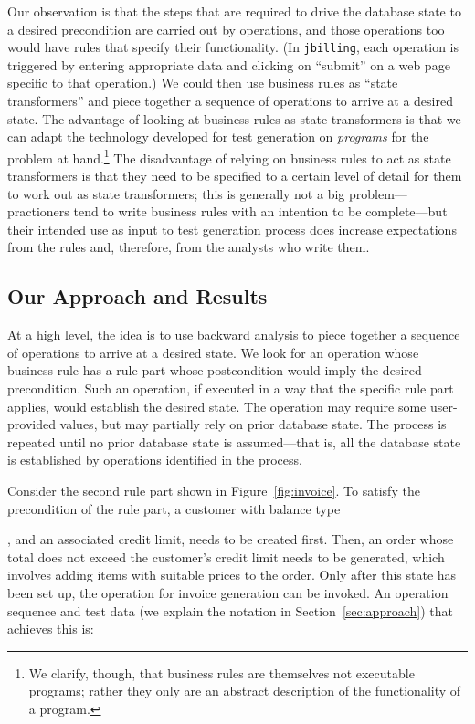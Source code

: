 Our observation is that the steps that are required to drive the database state
to a desired precondition are carried out by operations, and those operations
too would have rules that specify their functionality.  (In \texttt{jbilling}, each
operation is triggered by entering appropriate data and clicking on ``submit'' on
a web page specific to that operation.) We could then use
business rules as ``state transformers'' and piece together a sequence of
operations to arrive at a desired state.  The advantage of looking at business
rules as state transformers is that we can adapt the technology developed for
test generation on \textit{programs} for the problem at hand.\footnote{We
  clarify, though, that business rules are themselves not executable programs;
  rather they only are an abstract description of the functionality of a
  program.}  The disadvantage of relying on business rules to act as state
transformers is that they need to be specified to a certain level of detail for
them to work out as state transformers; this is generally not a big
problem---practioners tend to write business rules with an intention to be
complete---but their intended use as input to test generation process does
increase expectations from the rules and, therefore, from the analysts who write
them.

\subsection{Our Approach and Results}

At a high level, the idea is to use backward analysis to piece together a
sequence of operations to arrive at a desired state.  We look for an operation
whose business rule has a rule part whose postcondition would imply the desired
precondition.  Such an operation, if executed in a way that the specific rule
part applies, would establish the desired state.  The operation may require some
user-provided values, but may partially rely on prior database state. The
process is repeated until no prior database state is assumed---that is, all the
database state is established by operations identified in the process.

Consider the second rule part shown in Figure~\ref{fig:invoice}. To satisfy the
precondition of the rule part, a customer with balance type \subject{Credit},
and an associated credit limit, needs to be created first. Then, an order whose
total does not exceed the customer's credit limit needs to be generated, which
involves adding items with suitable prices to the order. Only after this state
has been set up, the operation for invoice generation can be invoked. An
operation sequence and test data (we explain the notation in
Section~\ref{sec:approach}) that achieves this is:

